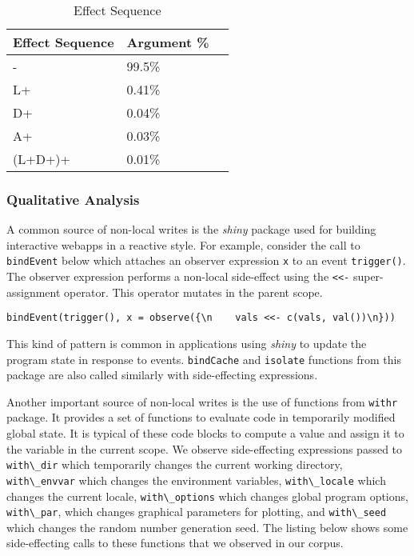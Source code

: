\documentclass[review,nonacm,screen,acmsmall,anonymous=true]{acmart}
\newcommand{\code}[1]{\lstinline |#1|\xspace}
\begin{document}
\begin{table}
  \vspace{-3mm}
  \small
  \caption{Effect Sequence} \label{table:effectseq}
  \centering
  \begin{tabular}{lll}
    \toprule
    \textbf{Effect Sequence}&\textbf{Argument \%}\\
    \midrule
    -&99.5\%\\
    L+&0.41\%\\
    D+&0.04\%\\
    A+&0.03\%\\
    (L+D+)+&0.01\%\\
    \bottomrule
  \end{tabular}
\end{table}


\subsubsection{Qualitative Analysis}

A common source of non-local writes is the \emph{shiny} package used for
building interactive webapps in a reactive style. For example, consider the call
to \code{bindEvent} below which attaches an observer expression \code{x} to an
event \code{trigger()}. The observer expression performs a non-local side-effect
using the \code{<<-} super-assignment operator. This operator mutates in the
parent scope.

\begin{lstlisting}
bindEvent(trigger(), x = observe({\n    vals <<- c(vals, val())\n}))
\end{lstlisting}

This kind of pattern is common in applications using \emph{shiny} to update the
program state in response to events. \code{bindCache} and
\code{isolate} functions from this package are also called similarly with
side-effecting expressions.

Another important source of non-local writes is the use of functions from
\code{withr} package. It provides a set of functions to evaluate code in
temporarily modified global state. It is typical of these code blocks to compute
a value and assign it to the variable in the current scope.
We observe side-effecting expressions passed to \code{with\_dir} which
temporarily changes the current working directory, \code{with\_envvar} which changes the
environment variables, \code{with\_locale} which changes the current locale,
\code{with\_options} which changes global program options, \code{with\_par}, which changes
graphical parameters for plotting, and \code{with\_seed} which changes the random
number generation seed. The listing below shows some side-effecting
calls to these functions that we observed in our corpus.
\end{document}
